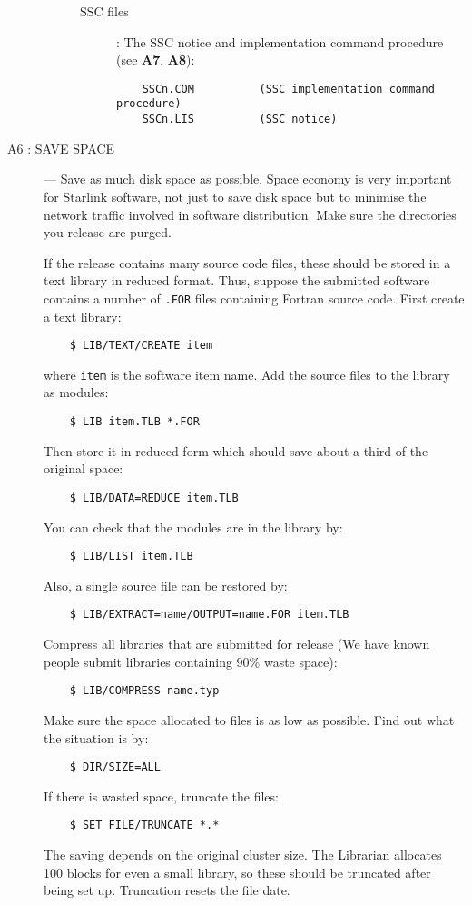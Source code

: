 \begin{description}
\begin{description}
\begin{description}
\item [SSC files]:
The SSC notice and implementation command procedure (see {\bf A7}, {\bf A8}):
\begin{verbatim}
    SSCn.COM          (SSC implementation command procedure)
    SSCn.LIS          (SSC notice)
\end{verbatim}
\end{description}
\end{description}

\item [A6 : SAVE SPACE] ---
Save as much disk space as possible.
Space economy is very important for Starlink software, not just to save disk
space but to minimise the network traffic involved in software distribution.
Make sure the directories you release are purged.

If the release contains many source code files, these should be stored in a text
library in reduced format.
Thus, suppose the submitted software contains a number of {\tt *.FOR} files
containing Fortran source code.
First create a text library:
\begin{verbatim}
    $ LIB/TEXT/CREATE item
\end{verbatim}
where {\tt item} is the software item name.
Add the source files to the library as modules:
\begin{verbatim}
    $ LIB item.TLB *.FOR
\end{verbatim}
Then store it in reduced form which should save about a third of the original
space:
\begin{verbatim}
    $ LIB/DATA=REDUCE item.TLB
\end{verbatim}
You can check that the modules are in the library by:
\begin{verbatim}
    $ LIB/LIST item.TLB
\end{verbatim}
Also, a single source file can be restored by:
\begin{verbatim}
    $ LIB/EXTRACT=name/OUTPUT=name.FOR item.TLB
\end{verbatim}
Compress all libraries that are submitted for release
(We have known people submit libraries containing 90\% waste space):
\begin{verbatim}
    $ LIB/COMPRESS name.typ
\end{verbatim}
Make sure the space allocated to files is as low as possible.
Find out what the situation is by:
\begin{verbatim}
    $ DIR/SIZE=ALL
\end{verbatim}
If there is wasted space, truncate the files:
\begin{verbatim}
    $ SET FILE/TRUNCATE *.*
\end{verbatim}
The saving depends on the original cluster size.
The Librarian allocates 100 blocks for even a small library, so these should be
truncated after being set up.
Truncation resets the file date.


\end{description}
